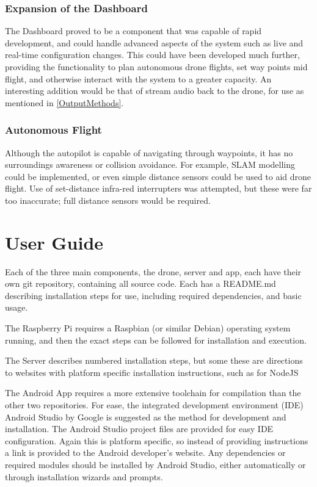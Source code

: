 \documentclass{article}
\begin{document}
\subsubsection{Expansion of the Dashboard}
The Dashboard proved to be a component that was capable of rapid development, and could handle advanced aspects of the system such as live and real-time configuration changes. This could have been developed much further, providing the functionality to plan autonomous drone flights, set way points mid flight, and otherwise interact with the system to a greater capacity. An interesting addition would be that of stream audio back to the drone, for use as mentioned in \ref{OutputMethods}.

\subsubsection{Autonomous Flight}
Although the autopilot is capable of navigating through waypoints, it has no surroundings awareness or collision avoidance. For example, SLAM modelling could be implemented, or even simple distance sensors could be used to aid drone flight. Use of set-distance infra-red interrupters was attempted, but these were far too inaccurate; full distance sensors would be required. 

\section{User Guide}\label{UserGuide}
Each of the three main components, the drone, server and app, each have their own git repository, containing all source code. Each has a README.md describing installation steps for use, including required dependencies, and basic usage. 

The Raspberry Pi requires a Raspbian (or similar Debian) operating system running, and then the exact steps can be followed for installation and execution.

The Server describes numbered installation steps, but some these are directions to websites with platform specific installation instructions, such as for NodeJS

The Android App requires a more extensive toolchain for compilation than the other two repositories. For ease, the integrated development environment (IDE) Android Studio by Google is suggested as the method for development and installation. The Android Studio project files are provided for easy IDE configuration. Again this is platform specific, so instead of providing instructions a link is provided to the Android developer's website. Any dependencies or required modules should be installed by Android Studio, either automatically or through installation wizards and prompts. 
\end{document}
